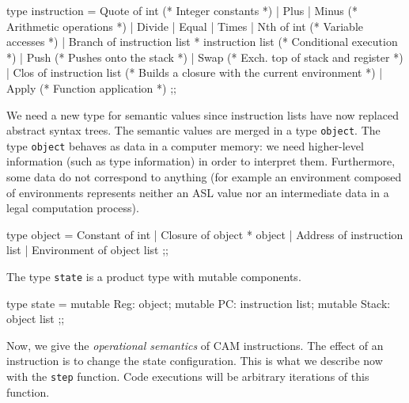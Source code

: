 %
\begin{caml_example}
type instruction =
  Quote of int               (* Integer constants *)
| Plus | Minus               (* Arithmetic operations *)
| Divide | Equal | Times 
| Nth of int                 (* Variable accesses *)
| Branch of instruction list * instruction list
                             (* Conditional execution *)
| Push                       (* Pushes onto the stack *)
| Swap                       (* Exch. top of stack and register *)
| Clos of instruction list   (* Builds a closure with the current environment *)
| Apply                      (* Function application *)
;;
\end{caml_example}
We need a new type for semantic values since instruction lists have now
replaced abstract syntax trees. The semantic values are merged in a
type {\tt object}.  The type {\tt object} behaves as data in a
computer memory: we need higher-level information (such as type
information) in order to interpret them. Furthermore, some data do not
correspond to anything (for example an environment composed of
environments represents neither an ASL value nor an intermediate
data in a legal computation process).
%
\begin{caml_example}
type object = Constant of int
            | Closure of object * object
            | Address of instruction list
            | Environment of object list
;;
\end{caml_example}
The type {\tt state} is a product type with mutable components.
\begin{caml_example}
type state = {mutable Reg: object;
              mutable PC: instruction list;
              mutable Stack: object list}
;;
\end{caml_example}
Now, we give the {\em operational semantics} of CAM instructions. The
effect of an instruction is to change the state configuration. This is
what we describe now with the {\tt step} function. Code executions
will be arbitrary iterations of this function.
